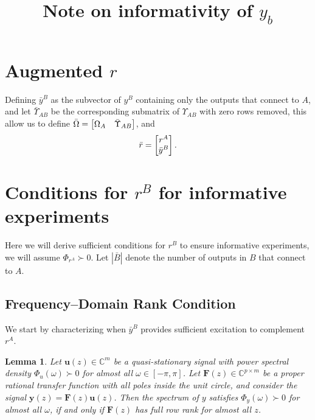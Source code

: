 \documentclass[11pt,a4paper]{article}
\title{Note on informativity of $y_b$}
\newtheorem{lemma}[theorem]{Lemma}
\begin{document}
\maketitle

\section{Augmented $r$}


Defining $\bar y^B$ as the subvector of $y^B$ containing only the outputs that connect to $A$, and let $\bar \Upsilon_{AB}$ be the corresponding submatrix of $\Upsilon_{AB}$ with zero rows removed, this allow us to define $\bar \Omega = \begin{bmatrix} \Omega_A & \bar\Upsilon_{AB} \end{bmatrix}$, and
\begin{align}\label{eq:aug_r_A}
    \bar r = \begin{bmatrix} r^A \\ \bar y^{B} \end{bmatrix}.
\end{align}



\section{Conditions for $r^B$ for informative experiments}
Here we will derive sufficient conditions for $r^B$ to ensure informative experiments, we will assume $\Phi_{r^A} \succ 0$. Let $|\bar B|$ denote the number of outputs in $B$ that connect to $A$.

\subsection{Frequency–Domain Rank Condition}

We start by characterizing when $\bar y^{B}$ provides sufficient excitation to complement $r^A$.

\begin{lemma}\label{lem:informative_rank_lemma}Let $\mathbf u(z) \in \mathbb{C}^m$ be a quasi-stationary signal with power spectral density $\Phi_{u}(\omega) \succ 0$ for almost all $\omega \in [-\pi, \pi]$. Let $\mathbf F(z) \in \mathbb{C}^{p \times m}$ be a proper rational transfer function with all poles inside the
unit circle, and consider the signal $\mathbf y(z) = \mathbf F(z)\mathbf u(z)$.  Then the spectrum of $y$ satisfies $\Phi_{y}(\omega) \succ 0$ for almost all $\omega$, if and only if $\mathbf F(z)$ has full row rank for almost all $z$.
\end{lemma}
\end{document}
